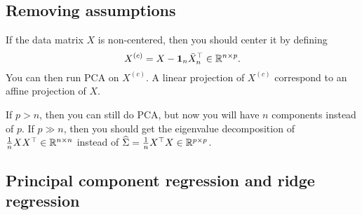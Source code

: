 \subsection{Removing assumptions}

If the data matrix $X$ is non-centered, then you should center it by defining 
\[X^{(c)}=X- \mathbf 1_n \bar{X}_n^\top\in \mathbb{R}^{n \times p}.\] 
You can then run PCA on $X^{(c)}$. A linear projection of $X^{(c)}$ correspond to an affine projection of $X$. 

If $p > n$, then you can still do PCA, but now you will have $n$ components instead of $p$. If $p \gg n$, then you should get the eigenvalue decomposition of $\frac{1}{n}XX^\top \in \mathbb{R}^{n \times n}$ instead of $\widehat{\Sigma} = \frac{1}{n}X^\top X \in \mathbb{R}^{p \times p}$. 

\subsection{Principal component regression and ridge regression}

